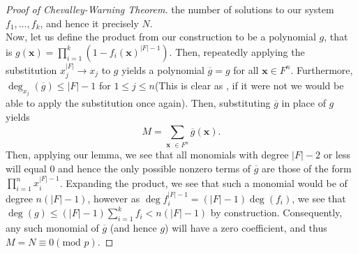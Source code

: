 \begin{proof}[Proof of
Chevalley-Warning Theorem]
the number of solutions to our system $f_1, \ldots, f_{k}$, and hence it
precisely $N$.\\ Now, let us define the product from our construction to be a
polynomial  $g$, that is $g\left( \textbf{x} \right) = \prod_{i= 1}^{k} \left(
	1-f_{i}\left( \textbf{x} \right) ^{\left| F \right| -1} \right)$. Then,
	repeatedly applying the substitution $ x_{j}^{\left| F \right| } \to
	x_{j}$ to $g$ yields a polynomial $\overline{g} = g$ for all
	$\textbf{x}\in F^{n}$. Furthermore, $ \deg _{ x_j} \left(  \overline{g}
	\right) \le \left| F \right| -1$ for $1 \le j \le n$(This is clear as ,
	if it were not we would be able to apply the substitution once again).
	Then, substituting $\overline{g}$ in place of $g$ yields \[ M =
	\sum_{\textbf{x } \in F^{n}}^{} \overline{g}\left( \textbf{x} \right)
.\] Then, applying our lemma, we see that all monomials with degree $\left| F
\right|  -2$ or less will equal $0$ and hence the only possible nonzero terms
of $\overline{g}$ are those of the form $ \prod_{i= 1}^{n}  x_{i}^{\left| F
\right| -1}$. Expanding the product, we see that such a monomial would be of
degree $n\left(\left| F \right| - 1 \right)$, however as $\deg f_{i} ^{\left| F
\right| -1} = \left( \left| F \right| -1 \right) \deg \left( f_{i} \right)$, we
see that $\deg \left( g \right) \le \left( \left| F \right| -1 \right) \sum_{i=
1}^{k} f_{i} < n\left( \left| F \right| -1 \right)$ by construction.
Consequently, any such monomial of $\overline{g}$ (and hence $g$) will have a
zero coefficient, and thus $M = N \equiv 0 \left( \text{mod } p \right) $.
\end{proof}

